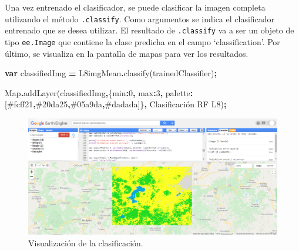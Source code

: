 \documentclass[
  12pt,
  letterpaper,
  twoside]{book}
\newenvironment{Shaded}{\begin{snugshade}}{\end{snugshade}}
\newcommand{\BuiltInTok}[1]{#1}
\newcommand{\DataTypeTok}[1]{\textcolor[rgb]{0.13,0.29,0.53}{#1}}
\newcommand{\DecValTok}[1]{\textcolor[rgb]{0.00,0.00,0.81}{#1}}
\newcommand{\FunctionTok}[1]{\textcolor[rgb]{0.00,0.00,0.00}{#1}}
\newcommand{\KeywordTok}[1]{\textcolor[rgb]{0.13,0.29,0.53}{\textbf{#1}}}
\newcommand{\NormalTok}[1]{#1}
\newcommand{\OperatorTok}[1]{\textcolor[rgb]{0.81,0.36,0.00}{\textbf{#1}}}
\newcommand{\StringTok}[1]{\textcolor[rgb]{0.31,0.60,0.02}{#1}}
\begin{document}
Una vez entrenado el clasificador, se puede clasificar la imagen completa utilizando el método \texttt{.classify}. Como argumentos se indica el clasificador entrenado que se desea utilizar. El resultado de \texttt{.classify} va a ser un objeto de tipo \texttt{ee.Image} que contiene la clase predicha en el campo `classification'. Por último, se visualiza en la pantalla de mapas para ver los resultados.

\begin{Shaded}
\begin{Highlighting}[]
\KeywordTok{var}\NormalTok{ classifiedImg }\OperatorTok{=}\NormalTok{ L8imgMean}\OperatorTok{.}\FunctionTok{classify}\NormalTok{(trainedClassifier)}\OperatorTok{;}

\BuiltInTok{Map}\OperatorTok{.}\FunctionTok{addLayer}\NormalTok{(classifiedImg}\OperatorTok{,}\NormalTok{\{}\DataTypeTok{min}\OperatorTok{:}\DecValTok{0}\OperatorTok{,} \DataTypeTok{max}\OperatorTok{:}\DecValTok{3}\OperatorTok{,} 
  \DataTypeTok{palette}\OperatorTok{:}\NormalTok{[}\StringTok{\textquotesingle{}\#fcff21\textquotesingle{}}\OperatorTok{,}\StringTok{\textquotesingle{}\#20da25\textquotesingle{}}\OperatorTok{,}\StringTok{\textquotesingle{}\#05a9da\textquotesingle{}}\OperatorTok{,}\StringTok{\textquotesingle{}\#dadada\textquotesingle{}}\NormalTok{]\}}\OperatorTok{,}
  \StringTok{\textquotesingle{}Clasificación RF L8\textquotesingle{}}\NormalTok{)}\OperatorTok{;}
\end{Highlighting}
\end{Shaded}

\begin{figure}

{\centering \includegraphics[width=1\linewidth]{Img/RFClass} 

}

\caption{Visualización de la clasificación.}\label{fig:unnamed-chunk-186}
\end{figure}
\end{document}
